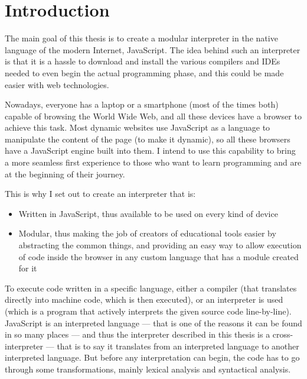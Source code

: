 \chapter*{Introduction}

The main goal of this thesis is to create a modular interpreter in the native language of the modern Internet, JavaScript. The idea behind such an interpreter is that it is a hassle to download and install the various compilers and IDEs needed to even begin the actual programming phase, and this could be made easier with web technologies.

Nowadays, everyone has a laptop or a smartphone (most of the times both) capable of browsing the World Wide Web, and all these devices have a browser to achieve this task. Most dynamic websites use JavaScript as a language to manipulate the content of the page (to make it dynamic), so all these browsers have a JavaScript engine built into them. I intend to use this capability to bring a more seamless first experience to those who want to learn programming and are at the beginning of their journey. 

This is why I set out to create an interpreter that is:
\begin{itemize}
\item Written in JavaScript, thus available to be used on every kind of device
\item Modular, thus making the job of creators of educational tools easier by abstracting the common things, and providing an easy way to allow execution of code inside the browser in any custom language that has a module created for it
\end{itemize}

To execute code written in a specific language, either a compiler (that translates directly into machine code, which is then executed), or an interpreter is used (which is a program that actively interprets the given source code line-by-line). JavaScript is an interpreted language --- that is one of the reasons it can be found in so many places --- and thus the interpreter described in this thesis is a cross-interpreter --- that is to say it translates from an interpreted language to another interpreted language. But before any interpretation can begin, the code has to go through some transformations, mainly lexical analysis and syntactical analysis.

